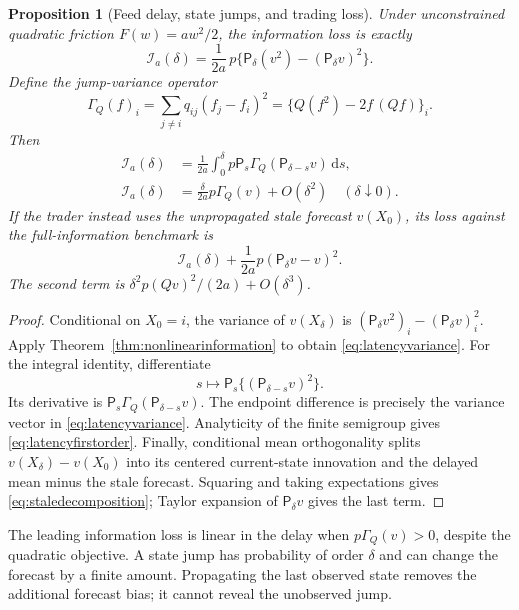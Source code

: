 \documentclass[11pt]{article}
\theoremstyle{plain}
\newtheorem{proposition}[theorem]{Proposition}
\theoremstyle{definition}
\theoremstyle{remark}
\newcommand{\dd}{\,\mathrm d}
\begin{document}
\begin{proposition}[Feed delay, state jumps, and trading loss]
\label{prop:feedlatency}
Under unconstrained quadratic friction \(F(w)=aw^2/2\),
the information loss is exactly
\begin{equation}\label{eq:latencyvariance}
 \mathcal I_a(\delta)
 =\frac1{2a}\,
  p\{\mathsf P_\delta(v^2)-(\mathsf P_\delta v)^2\}.
\end{equation}
Define the jump-variance operator
\[
 \Gamma_Q(f)_i
 =\sum_{j\ne i}q_{ij}(f_j-f_i)^2
 =\{Q(f^2)-2f\,(Qf)\}_i .
\]
Then
\begin{align}
 \mathcal I_a(\delta)
 &=\frac1{2a}\int_0^\delta
     p\mathsf P_s\Gamma_Q(\mathsf P_{\delta-s}v)\dd s,
 \label{eq:latencycarre}\\
 \mathcal I_a(\delta)
 &=\frac{\delta}{2a}p\Gamma_Q(v)+O(\delta^2)
 \quad(\delta\downarrow0). \label{eq:latencyfirstorder}
\end{align}
If the trader instead uses the unpropagated stale forecast
\(v(X_0)\), its loss against the full-information benchmark is
\begin{equation}\label{eq:staledecomposition}
 \mathcal I_a(\delta)+
 \frac1{2a}p(\mathsf P_\delta v-v)^2 .
\end{equation}
The second term is
\(\delta^2p(Qv)^2/(2a)+O(\delta^3)\).
\end{proposition}
\begin{proof}
Conditional on \(X_0=i\), the variance of \(v(X_\delta)\)
is \((\mathsf P_\delta v^2)_i-(\mathsf P_\delta v)_i^2\).
Apply Theorem~\ref{thm:nonlinearinformation} to obtain
\eqref{eq:latencyvariance}.
For the integral identity, differentiate
\[
 s\longmapsto
 \mathsf P_s\{(\mathsf P_{\delta-s}v)^2\}.
\]
Its derivative is
\(\mathsf P_s\Gamma_Q(\mathsf P_{\delta-s}v)\).
The endpoint difference is precisely the variance vector in
\eqref{eq:latencyvariance}. Analyticity of the finite semigroup
gives \eqref{eq:latencyfirstorder}.
Finally, conditional mean orthogonality splits
\(v(X_\delta)-v(X_0)\) into its centered current-state innovation
and the delayed mean minus the stale forecast. Squaring and taking
expectations gives \eqref{eq:staledecomposition}; Taylor expansion
of \(\mathsf P_\delta v\) gives the last term.
\end{proof}

The leading information loss is linear in the delay when
\(p\Gamma_Q(v)>0\), despite the quadratic objective.
A state jump has probability of order \(\delta\) and can change
the forecast by a finite amount. Propagating the last observed
state removes the additional forecast bias; it cannot reveal the
unobserved jump.
\end{document}
